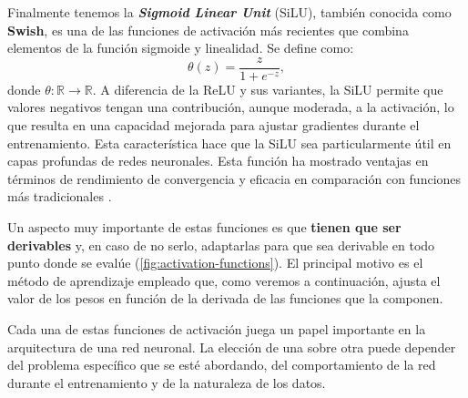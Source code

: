 %
%
Finalmente tenemos la \textbf{\textit{Sigmoid Linear Unit}} (SiLU), también conocida
como \textbf{Swish}, es una de las funciones de activación más recientes que combina
elementos de la función sigmoide y linealidad. Se define como:
\begin{equation}
	\theta(z) = \frac{z}{1 + e^{-z}},
\end{equation}
donde $\theta : \mathbb{R}\to \mathbb{R}$. A diferencia de la ReLU y sus
variantes, la SiLU permite que valores negativos tengan una contribución, aunque
moderada, a la activación, lo que resulta en una capacidad mejorada para ajustar
gradientes durante el entrenamiento. Esta característica hace que la SiLU sea particularmente
útil en capas profundas de redes neuronales. Esta función ha mostrado ventajas
en términos de rendimiento de convergencia y eficacia en comparación con
funciones más tradicionales \cite{ramachandran2017searching}.

Un aspecto muy importante de estas funciones es que \textbf{tienen que ser
	derivables} y, en caso de no serlo, adaptarlas para que sea derivable en todo punto
donde se evalúe (\autoref{fig:activation-functions}). El principal motivo es el
método de aprendizaje empleado que, como veremos a continuación, ajusta el valor
de los pesos en función de la derivada de las funciones que la componen.

Cada una de estas funciones de activación juega un papel importante en la
arquitectura de una red neuronal. La elección de una sobre otra puede depender del
problema específico que se esté abordando, del comportamiento de la red durante
el entrenamiento y de la naturaleza de los datos.

